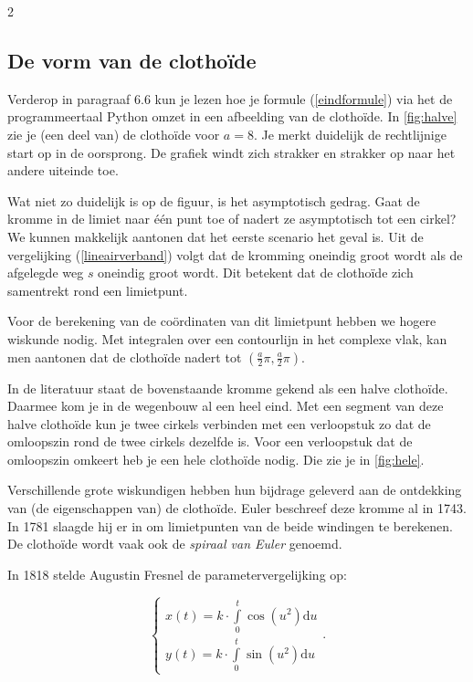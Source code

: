 \begin{multicols}{2}
\subsection{De vorm van de clothoïde}

Verderop in paragraaf 6.6 kun je lezen hoe je formule (\ref{eindformule}) via het de programmeertaal Python omzet in een afbeelding van de clothoïde. In \autoref{fig:halve} zie je (een deel van) de clothoïde voor $a=8$. Je merkt duidelijk de rechtlijnige start op in de oorsprong. De grafiek windt zich strakker en strakker op naar het andere uiteinde toe. 

Wat niet zo duidelijk is op de figuur, is het asymptotisch gedrag. Gaat de kromme in de limiet naar één punt toe of nadert ze asymptotisch tot een cirkel? We kunnen makkelijk aantonen dat het eerste scenario het geval is. Uit de vergelijking (\ref{lineairverband}) volgt dat de kromming oneindig groot wordt als de afgelegde weg $s$ oneindig groot wordt. Dit betekent dat de clothoïde zich samentrekt rond een limietpunt. 

Voor de berekening van de coördinaten van dit limietpunt hebben we hogere wiskunde nodig. Met integralen over een contourlijn in het complexe vlak, kan men aantonen dat de clothoïde nadert tot $(\frac{a}{2} \pi, \frac{a}{2} \pi).$


In de literatuur staat de bovenstaande kromme gekend als een halve clothoïde. Daarmee kom je in de wegenbouw al een heel eind. Met een segment van deze halve clothoïde kun je twee cirkels verbinden met een verloopstuk zo dat de omloopszin rond de twee cirkels dezelfde is. Voor een verloopstuk dat de omloopszin omkeert heb je een hele clothoïde nodig. Die zie je in \autoref{fig:hele}.

Verschillende grote wiskundigen hebben hun bijdrage geleverd aan de ontdekking van (de eigenschappen van) de clothoïde. Euler beschreef deze kromme al in 1743. In 1781 slaagde hij er in om limietpunten van de beide windingen te berekenen. De clothoïde wordt vaak ook de \emph{spiraal van Euler} genoemd. 


In 1818 stelde Augustin Fresnel de parametervergelijking op: 

\[\begin{cases}
x(t)=k \cdot \int \limits_0^t \cos (u^2) \textrm{d}u \\
y(t)=k \cdot \int \limits_0^t \sin (u^2) \textrm{d}u 
\end{cases}.\]


\end{multicols}
